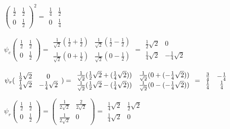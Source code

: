 \documentclass{article}
\begin{document}
$( 
\begin{array}{cc}
\frac{1}{2} & \frac{1}{2} \\ 
0 & \frac{1}{2}
\end{array}
)^{2}=\allowbreak 
\begin{array}{cc}
\frac{1}{4} & \frac{1}{2} \\ 
0 & \frac{1}{4}
\end{array}
$

{\tiny \bigskip }

$\psi _{c}(
\begin{array}{cc}
\frac{1}{2} & \frac{1}{2} \\ 
0 & \frac{1}{2}
\end{array}
)=
\begin{array}{cc}
\frac{1}{\sqrt{2}}\left( \frac{1}{2}+\frac{1}{2}\right)  & \frac{1}{\sqrt{2}}%
\left( \frac{1}{2}-\frac{1}{2}\right)  \\ 
\frac{1}{\sqrt{2}}(0+\frac{1}{2}) & \frac{1}{\sqrt{2}}(0-\frac{1}{2})
\end{array}
=\allowbreak 
\begin{array}{cc}
\frac{1}{2}\sqrt{2} & 0 \\ 
\frac{1}{4}\sqrt{2} & -\frac{1}{4}\sqrt{2}
\end{array}
$

$\psi _{r}(
\begin{array}{cc}
\frac{1}{2}\sqrt{2} & 0 \\ 
\frac{1}{4}\sqrt{2} & -\frac{1}{4}\sqrt{2}
\end{array}
)=
\begin{array}{cc}
\frac{1}{\sqrt{2}}(\frac{1}{2}\sqrt{2}+(\frac{1}{4}\sqrt{2})) & \frac{1}{%
\sqrt{2}}(0+(-\frac{1}{4}\sqrt{2})) \\ 
\frac{1}{\sqrt{2}}(\frac{1}{2}\sqrt{2}-(\frac{1}{4}\sqrt{2})) & \frac{1}{%
\sqrt{2}}(0-(-\frac{1}{4}\sqrt{2}))
\end{array}
=\allowbreak 
\begin{array}{cc}
\frac{3}{4} & -\frac{1}{4} \\ 
\frac{1}{4} & \frac{1}{4}
\end{array}
$

$\psi _{r}(
\begin{array}{cc}
\frac{1}{2} & \frac{1}{2} \\ 
0 & \frac{1}{2}
\end{array}
)=(
\begin{array}{cc}
\frac{1}{2\sqrt{2}} & \frac{2}{2\sqrt{2}} \\ 
\frac{1}{2\sqrt{2}} & 0
\end{array}
)=\allowbreak 
\begin{array}{cc}
\frac{1}{4}\sqrt{2} & \frac{1}{2}\sqrt{2} \\ 
\frac{1}{4}\sqrt{2} & 0
\end{array}
$
\end{document}
